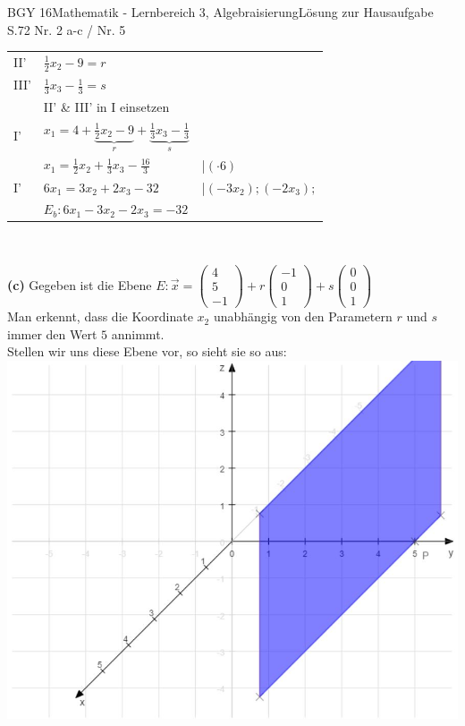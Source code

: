 \documentclass[oneside,openany,headings=optiontotoc,11pt,numbers=noenddot]{scrreprt}
\begin{document}
\begin{worksheet}{BGY 16}{Mathematik - Lernbereich 3, Algebraisierung}{Lösung zur Hausaufgabe S.72 Nr. 2 a-c / Nr. 5}
\begin{framed}
\begin{tabularx}{\textwidth}{lll}
				\hline
				II'& \(\frac{1}{2}x_2 - 9 = r\)\\
				III' & \(\frac{1}{3}x_3 -\frac{1}{3} = s\)\\
				& \multicolumn{2}{l}{II' \& III' in I einsetzen}\\
				I' & \(x_1 = 4 + \underbrace{\frac{1}{2}x_2 - 9}_{r} + \underbrace{\frac{1}{3}x_3 -\frac{1}{3}}_{s}\)\\
				& \(x_1 = \frac{1}{2}x_2 + \frac{1}{3}x_3 - \frac{16}{3}\) & |\((\cdot 6)\)\\
				I' & \(6x_1 = 3x_2 + 2x_3 - 32\) & |\((-3x_2);(-2x_3);\)\\
				& \colorbox{green!10}{\(E_b: 6x_1 - 3x_2 - 2x_3 = -32\)}
			\end{tabularx}\\
			\par
			\textbf{(c)} Gegeben ist die Ebene \(E:\vec{x} = \left(\begin{array}{c}4\\5\\-1\end{array}\right) + r\left(\begin{array}{c}-1\\0\\1\end{array}\right) + s\left(\begin{array}{c}0\\0\\1\end{array}\right)\)\\
			Man erkennt, dass die Koordinate \(x_2\) unabhängig von den Parametern \(r\) und \(s\) immer den Wert \(5\) annimmt.\\
			Stellen wir uns diese Ebene vor, so sieht sie so aus:\\
			\includegraphics[scale=0.45]{Bilder/S72N2c.jpg}\\

\end{framed}
\end{worksheet}
\end{document}
